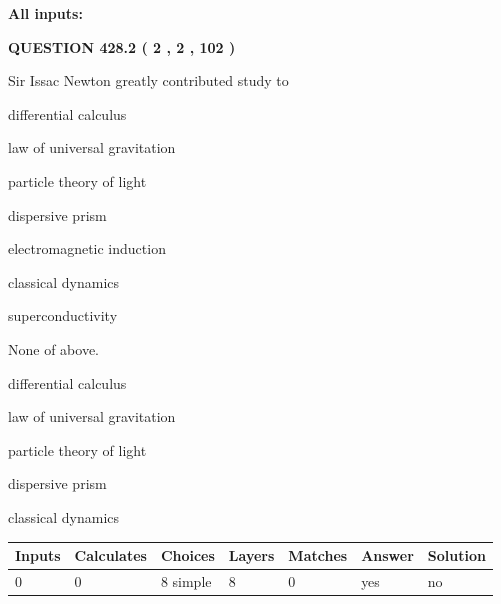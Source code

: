 \documentclass[12pt]{article}
\begin{document}
   
   
   
\noindent{}
   
   
   
   
\noindent\vspace{0.1in}\hspace{-0.08in} {\textbf{\Large{All inputs: }}}
   
   
  
\vspace{0.2in}
  
{\textbf{\Large{QUESTION
428.2 
 ( 2 , 2 , 102 )
}}}
  
  
Sir Issac Newton greatly contributed study to
 
 
differential calculus
 
 
law of universal gravitation
 
 
particle theory of light
 
 
dispersive prism
 
 
electromagnetic induction
 
 
classical dynamics
 
 
superconductivity
 
 
 None of above.
 
 
\noindent{}
 
 
differential calculus
 
 
law of universal gravitation
 
 
particle theory of light
 
 
dispersive prism
 
 
classical dynamics
 
 
\noindent{}
 
 
   
   
   
   
\noindent\begin{tabular}{|l|l|l|l|l|l|l|}
 \hline
Inputs & Calculates & Choices & Layers & Matches & Answer & Solution \\ \hline
 0  & 
 0  & 
 8
  simple  
  & 
 8  & 
 0  & 
  yes & 
  no 
  \\ \hline
 \end{tabular}
   
\end{document}
